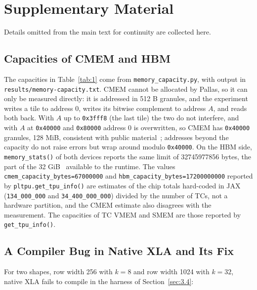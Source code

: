 \documentclass[sigconf,nonacm,balance=false]{acmart}
\newcommand{\code}[1]{\texttt{#1}}
\begin{document}
\section{Supplementary Material}
\label{sec:C}

Details omitted from the main text for continuity are collected here.

\subsection{Capacities of CMEM and HBM}
\label{sec:C.1}

The capacities in Table~\ref{tab:1} come from \code{memory\_\allowbreak{}capacity.\allowbreak{}py}, with output in \code{results/\allowbreak{}memory-capacity.\allowbreak{}txt}. CMEM cannot be allocated by Pallas, so it can only be measured directly: it is addressed in 512 B granules, and the experiment writes a tile to address 0, writes its bitwise complement to address $A$, and reads both back. With $A$ up to \code{0x3fff8} (the last tile) the two do not interfere, and with $A$ at \code{0x40000} and \code{0x80000} address 0 is overwritten, so CMEM has \code{0x40000} granules, 128 MiB, consistent with public material~\cite{jouppi2023tpuv4}; addresses beyond the capacity do not raise errors but wrap around modulo \code{0x40000}. On the HBM side, \code{memory\_\allowbreak{}stats(\allowbreak{})} of both devices reports the same limit of 32745977856 bytes, the part of the 32 GiB~\cite{jouppi2023tpuv4} available to the runtime. The values \code{cmem\_\allowbreak{}capacity\_\allowbreak{}bytes=\allowbreak{}67000000} and \code{hbm\_\allowbreak{}capacity\_\allowbreak{}bytes=\allowbreak{}17200000000} reported by \code{pltpu.\allowbreak{}get\_\allowbreak{}tpu\_\allowbreak{}info(\allowbreak{})} are estimates of the chip totals hard-coded in JAX (\code{134\_\allowbreak{}000\_\allowbreak{}000} and \code{34\_\allowbreak{}400\_\allowbreak{}000\_\allowbreak{}000}) divided by the number of TCs, not a hardware partition, and the CMEM estimate also disagrees with the measurement. The capacities of TC VMEM and SMEM are those reported by \code{get\_\allowbreak{}tpu\_\allowbreak{}info(\allowbreak{})}.

\subsection{A Compiler Bug in Native XLA and Its Fix}
\label{sec:C.2}

For two shapes, row width 256 with $k = 8$ and row width 1024 with $k = 32$, native XLA fails to compile in the harness of Section~\ref{sec:3.4}:
\end{document}
